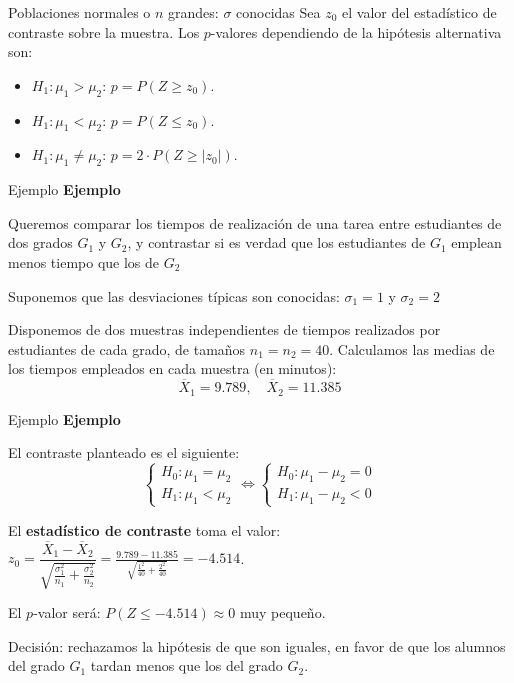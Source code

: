 \documentclass[
  ignorenonframetext,
]{beamer}
\providecommand{\tightlist}{%
  \setlength{\itemsep}{0pt}\setlength{\parskip}{0pt}}
\begin{document}
\begin{frame}{Poblaciones normales o \(n\) grandes: \(\sigma\)
conocidas}
\protect\hypertarget{poblaciones-normales-o-n-grandes-sigma-conocidas-1}{}
Sea \(z_0\) el valor del estadístico de contraste sobre la muestra. Los
\(p\)-valores dependiendo de la hipótesis alternativa son:

\begin{itemize}[<+->]
\tightlist
\item
  \(H_1:\mu_1 >\mu_2\): \(p=P(Z \geq z_0)\).
\item
  \(H_1:\mu_1 <\mu_2\): \(p=P(Z \leq z_0)\).
\item
  \(H_1:\mu_1 \neq \mu_2\): \(p=2\cdot P(Z \geq |z_0|)\).
\end{itemize}
\end{frame}

\begin{frame}{Ejemplo}
\protect\hypertarget{ejemplo-22}{}
\textbf{Ejemplo}

Queremos comparar los tiempos de realización de una tarea entre
estudiantes de dos grados \(G_1\) y \(G_2\), y contrastar si es verdad
que los estudiantes de \(G_1\) emplean menos tiempo que los de \(G_2\)

Suponemos que las desviaciones típicas son conocidas: \(\sigma_1=1\) y
\(\sigma_2=2\)

Disponemos de dos muestras independientes de tiempos realizados por
estudiantes de cada grado, de tamaños \(n_1=n_2=40\). Calculamos las
medias de los tiempos empleados en cada muestra (en minutos): \[
\overline{X}_1= 9.789,\quad \overline{X}_2=11.385
\]
\end{frame}

\begin{frame}{Ejemplo}
\protect\hypertarget{ejemplo-23}{}
\textbf{Ejemplo}

El contraste planteado es el siguiente: \[
\left\{\begin{array}{l}
H_0:\mu_1=\mu_2\\
H_1:\mu_1< \mu_2
\end{array}\right.
\Longleftrightarrow
\left\{\begin{array}{l}
H_0:\mu_1-\mu_2=0\\
H_1:\mu_1- \mu_2<0
\end{array}\right.
\]

El \textbf{estadístico de contraste} toma el valor:
\(z_0=\dfrac{\overline{X}_1-\overline{X}_2}{\sqrt{\frac{\sigma_1^2}{n_1}+\frac{\sigma_2^2}{n_2}}}=\frac{9.789-11.385}{\sqrt{\frac{1^2}{40}+\frac{2^2}{40}}}=-4.514\).

El \(p\)-valor será: \(P(Z\leq -4.514)\approx 0\) muy pequeño.

Decisión: rechazamos la hipótesis de que son iguales, en favor de que
los alumnos del grado \(G_1\) tardan menos que los del grado \(G_2\).
\end{frame}
\end{document}

